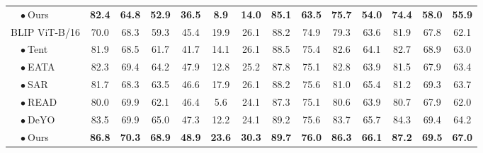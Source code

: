 \documentclass[11pt]{article}
\theoremstyle{plain}
\theoremstyle{definition}
\theoremstyle{remark}
\begin{document}
\begin{table}[h!]
\begin{center}
\begin{threeparttable}
{\begin{tabular}{l|cc|cc|cc|cc|cc|cc|>{\columncolor{blue!8}}c}
\rowcolor{pink!30}~~$\bullet~$Ours & \textbf{82.4}                         & \textbf{64.8} & \textbf{52.9} & \textbf{36.5} & \textbf{8.9}  & \textbf{14.0} & \textbf{85.1} & \textbf{63.5} & \textbf{75.7} & \textbf{54.0} & \textbf{74.4} & \textbf{58.0} & \textbf{55.9} \\
\cmidrule{1-14} 
BLIP ViT-B/16 & 70.0                         & 68.3 & 59.3 & 45.4 & 19.9 & 26.1 & 88.2 & 74.9 & 79.3 & 63.6 & 81.9 & 67.8 & 62.1 \\
~~$\bullet~$Tent & 81.9                         & 68.5 & 61.7 & 41.7 & 14.1 & 26.1 & 88.5 & 75.4 & 82.6 & 64.1 & 82.7 & 68.9 & 63.0 \\
~~$\bullet~$EATA & 82.3                         & 69.4 & 64.2 & 47.9 & 12.8 & 25.2 & 87.8 & 75.1 & 82.8 & 63.9 & 81.5 & 67.9 & 63.4 \\
~~$\bullet~$SAR & 81.7                         & 68.3 & 63.5 & 46.6 & 17.9 & 26.1 & 88.2 & 75.6 & 81.0 & 65.4 & 81.2 & 69.3 & 63.7 \\
~~$\bullet~$READ & 80.0                         & 69.9 & 62.1 & 46.4 & 5.6  & 24.1 & 87.3 & 75.1 & 80.6 & 63.9 & 80.7 & 67.9 & 62.0 \\
~~$\bullet~$DeYO & 83.5                         & 69.9 & 65.0 & 47.3 & 12.2 & 24.1 & 89.2 & 75.6 & 83.7 & 65.7 & 84.3 & 69.4 & 64.2 \\
\rowcolor{pink!30}~~$\bullet~$Ours & \textbf{86.8}                         & \textbf{70.3} & \textbf{68.9} & \textbf{48.9} & \textbf{23.6} & \textbf{30.3} & \textbf{89.7} & \textbf{76.0} & \textbf{86.3} & \textbf{66.1} & \textbf{87.2} & \textbf{69.5} & \textbf{67.0} \\
\cmidrule{1-14} 
\end{tabular}  
}  
\end{threeparttable}
	 \end{center}
\end{table}
\end{document}

